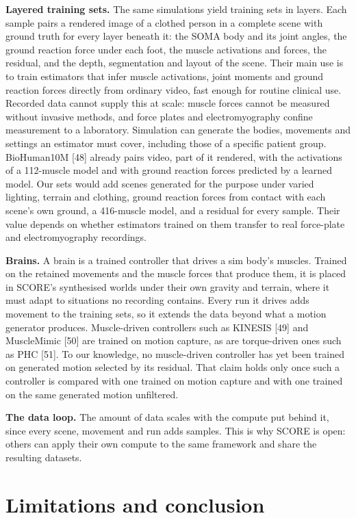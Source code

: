 \documentclass[
  11pt,
]{article}
\begin{document}
\textbf{Layered training sets.} The same simulations yield training sets
in layers. Each sample pairs a rendered image of a clothed person in a
complete scene with ground truth for every layer beneath it: the SOMA
body and its joint angles, the ground reaction force under each foot,
the muscle activations and forces, the residual, and the depth,
segmentation and layout of the scene. Their main use is to train
estimators that infer muscle activations, joint moments and ground
reaction forces directly from ordinary video, fast enough for routine
clinical use. Recorded data cannot supply this at scale: muscle forces
cannot be measured without invasive methods, and force plates and
electromyography confine measurement to a laboratory. Simulation can
generate the bodies, movements and settings an estimator must cover,
including those of a specific patient group. BioHuman10M {[}48{]}
already pairs video, part of it rendered, with the activations of a
112-muscle model and with ground reaction forces predicted by a learned
model. Our sets would add scenes generated for the purpose under varied
lighting, terrain and clothing, ground reaction forces from contact with
each scene's own ground, a 416-muscle model, and a residual for every
sample. Their value depends on whether estimators trained on them
transfer to real force-plate and electromyography recordings.

\textbf{Brains.} A brain is a trained controller that drives a sim
body's muscles. Trained on the retained movements and the muscle forces
that produce them, it is placed in SCORE's synthesised worlds under
their own gravity and terrain, where it must adapt to situations no
recording contains. Every run it drives adds movement to the training
sets, so it extends the data beyond what a motion generator produces.
Muscle-driven controllers such as KINESIS {[}49{]} and MuscleMimic
{[}50{]} are trained on motion capture, as are torque-driven ones such
as PHC {[}51{]}. To our knowledge, no muscle-driven controller has yet
been trained on generated motion selected by its residual. That claim
holds only once such a controller is compared with one trained on motion
capture and with one trained on the same generated motion unfiltered.

\textbf{The data loop.} The amount of data scales with the compute put
behind it, since every scene, movement and run adds samples. This is why
SCORE is open: others can apply their own compute to the same framework
and share the resulting datasets.

\section{Limitations and conclusion}\label{limitations-and-conclusion}
\end{document}
